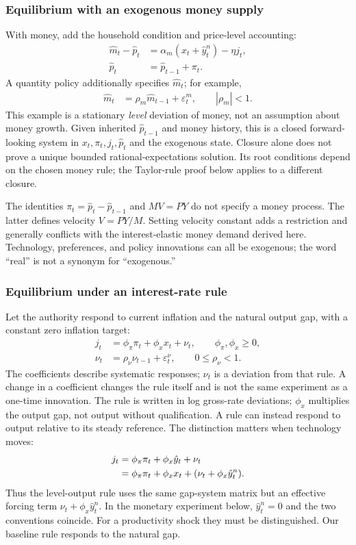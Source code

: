 \subsubsection{Equilibrium with an exogenous money supply}

With money, add the household condition and price-level accounting:
\begin{align}
 \hat m_t-\hat p_t&=\alpha_m(x_t+\hat y_t^n)-\eta j_t,\\
 \hat p_t&=\hat p_{t-1}+\pi_t.
\end{align}
A quantity policy additionally specifies $\hat m_t$; for example,
\begin{align}
 \hat m_t&=\rho_m\hat m_{t-1}+\varepsilon_t^m,\qquad |\rho_m|<1.
\end{align}
This example is a stationary \emph{level} deviation of money, not an assumption
about money growth. Given inherited $\hat p_{t-1}$ and money history, this is a
closed forward-looking system in $x_t,\pi_t,j_t,\hat p_t$ and the exogenous
state. Closure alone does not prove a unique bounded rational-expectations
solution. Its root conditions depend on the chosen money rule; the Taylor-rule
proof below applies to a different closure.

The identities $\pi_t=\hat p_t-\hat p_{t-1}$ and $MV=PY$ do not specify a
money process. The latter defines velocity $V=PY/M$. Setting velocity constant
adds a restriction and generally conflicts with the interest-elastic money
demand derived here. Technology, preferences, and policy innovations can all
be exogenous; the word ``real'' is not a synonym for ``exogenous.''

\subsubsection{Equilibrium under an interest-rate rule}

Let the authority respond to current inflation and the natural output gap,
with a constant zero inflation target:
\begin{align}
 j_t&=\phi_\pi\pi_t+\phi_x x_t+\nu_t,\qquad
 \phi_\pi,\phi_x\geq0,\\
 \nu_t&=\rho_\nu\nu_{t-1}+\varepsilon_t^\nu,\qquad 0\leq\rho_\nu<1.
 \label{eq:nk-rule}
\end{align}
The coefficients describe systematic responses; $\nu_t$ is a deviation from
that rule. A change in a coefficient changes the rule itself and is not the
same experiment as a one-time innovation. The rule is written in log gross-rate
deviations; $\phi_x$ multiplies the output gap, not output without qualification.
A rule can instead respond to output relative to its steady reference.
The distinction matters when technology moves:
\begin{align}
 j_t&=\phi_\pi\pi_t+\phi_x\hat y_t+\nu_t\notag\\
 &=\phi_\pi\pi_t+\phi_x x_t+(\nu_t+\phi_x\hat y_t^n).
\end{align}
Thus the level-output rule uses the same gap-system matrix but an effective
forcing term $\nu_t+\phi_x\hat y_t^n$. In the monetary experiment below,
$\hat y_t^n=0$ and the two conventions coincide. For a productivity shock they
must be distinguished. Our baseline rule responds to the natural gap.

